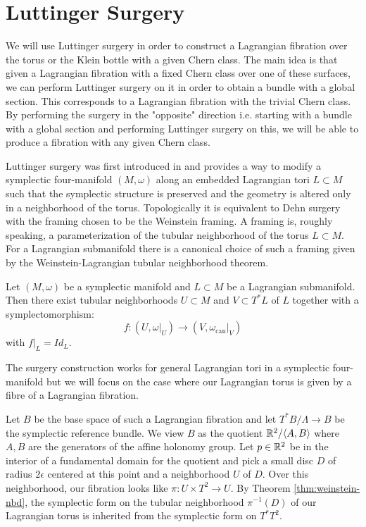 \section{Luttinger Surgery}\label{sec:Lutt}
We will use Luttinger surgery in order to construct a Lagrangian fibration over
the torus or the Klein bottle with a given Chern class. The main idea is that
given a Lagrangian fibration with a fixed Chern class over one of these
surfaces, we can perform Luttinger surgery on it in order to obtain a bundle
with a global section. This corresponds to a Lagrangian fibration with the
trivial Chern class. By performing the surgery in the "opposite" direction i.e.
starting with a bundle with a global section and performing Luttinger surgery
on this, we will be able to produce a fibration with any given Chern class.

Luttinger surgery was first introduced in \cite{LuttingerSurgery} and provides
a way to modify a symplectic four-manifold $(M, \omega)$ along an embedded
Lagrangian tori $L \subset M$ such that the symplectic structure is preserved
and the geometry is altered only in a neighborhood of the torus. Topologically
it is equivalent to Dehn surgery with the framing chosen to be the Weinstein
framing. A framing is, roughly speaking, a parameterization of the tubular
neighborhood of the torus $L \subset M$. For a Lagrangian submanifold there is
a canonical choice of such a framing given by the Weinstein-Lagrangian tubular
neighborhood theorem.

\begin{theorem}\label{thm:weinstein-nbd}
    Let $ (M, \omega)$ be a symplectic manifold and $L \subset M$ be a Lagrangian submanifold. Then there
    exist tubular neighborhoods $U \subset M$ and $V \subset T^*L$ of $L$ together with a symplectomorphism:
    $$f : (U, \omega|_U ) \to (V, \omega_{\text{can}}|_V )$$
    with $f|_L = Id_L$.
\end{theorem}
The surgery construction works for general Lagrangian tori in a symplectic four-manifold but we will focus on the case
where our Lagrangian torus is given by a fibre of a Lagrangian fibration.

Let $B$ be the base space of such a Lagrangian fibration and let $T^*B/\Lambda
    \to B$ be the symplectic reference bundle. We view $B$ as the quotient
$\mathbb{R}^2/\langle A, B \rangle$ where $A,B$ are the generators of the affine
holonomy group. Let $p \in \mathbb{R}^2$ be in the interior of a fundamental domain for
the quotient and pick a small disc $D$ of radius $2\epsilon$ centered at this
point and a neighborhood $U$ of $D$. Over this neighborhood, our fibration
looks like $\pi : U \times T^2 \to U$. By Theorem \ref{thm:weinstein-nbd}, the
symplectic form on the tubular neighborhood $\pi^{-1}(D)$ of our Lagrangian
torus is inherited from the symplectic form on $T^*T^2$.

